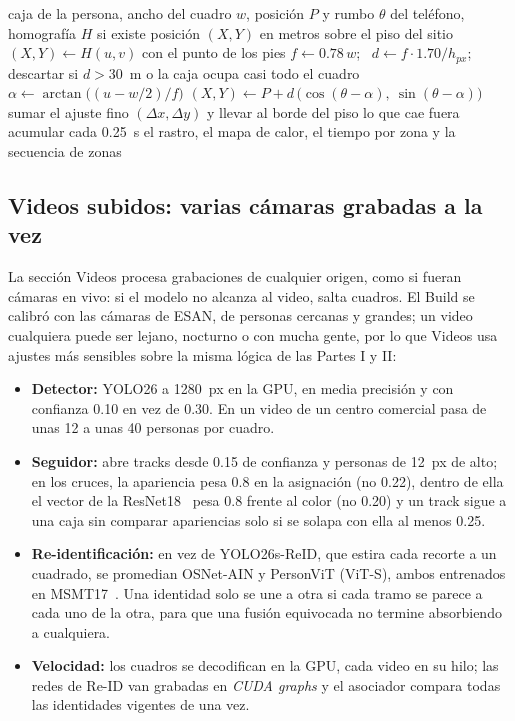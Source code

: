 \documentclass[12pt,a4paper]{article}
\begin{document}
\begin{algorithm}[H]
\caption{Ubicación en el plano desde un teléfono}
\label{alg:ubicacion}
\begin{algorithmic}[1]
\REQUIRE caja de la persona, ancho del cuadro $w$, posición $P$ y rumbo $\theta$ del teléfono, homografía $H$ si existe
\ENSURE posición $(X,Y)$ en metros sobre el piso del sitio
  \STATE $(X,Y) \leftarrow H(u,v)$ con el punto de los pies
\ELSE
  \STATE $f \leftarrow 0.78\,w$; \ $d \leftarrow f \cdot 1.70 / h_{px}$; descartar si $d > 30$~m o la caja ocupa casi todo el cuadro
  \STATE $\alpha \leftarrow \arctan\big((u - w/2)/f\big)$
  \STATE $(X,Y) \leftarrow P + d\,\big(\cos(\theta-\alpha),\ \sin(\theta-\alpha)\big)$
\ENDIF
\STATE sumar el ajuste fino $(\Delta x, \Delta y)$ y llevar al borde del piso lo que cae fuera
\STATE acumular cada 0.25~s el rastro, el mapa de calor, el tiempo por zona y la secuencia de zonas
\end{algorithmic}
\end{algorithm}

\subsection{Videos subidos: varias cámaras grabadas a la vez}
\label{sec:videos}

La sección Videos procesa grabaciones de cualquier origen, como si fueran
cámaras en vivo: si el modelo no alcanza al video, salta cuadros. El Build se
calibró con las cámaras de ESAN, de personas cercanas y grandes; un video
cualquiera puede ser lejano, nocturno o con mucha gente, por lo que Videos usa
ajustes más sensibles sobre la misma lógica de las Partes I y II:

\begin{itemize}
    \item \textbf{Detector:} YOLO26 a 1280~px en la GPU, en media precisión y
    con confianza 0.10 en vez de 0.30. En un video de un centro comercial pasa
    de unas 12 a unas 40 personas por cuadro.
    \item \textbf{Seguidor:} abre tracks desde 0.15 de confianza y personas de
    12~px de alto; en los cruces, la apariencia pesa 0.8 en la asignación (no
    0.22), dentro de ella el vector de la ResNet18~\cite{he2016} pesa 0.8 frente al color
    (no 0.20) y un track sigue a una caja sin comparar apariencias solo si se
    solapa con ella al menos 0.25.
    \item \textbf{Re-identificación:} en vez de YOLO26s-ReID, que estira cada
    recorte a un cuadrado, se promedian OSNet-AIN y PersonViT (ViT-S), ambos
    entrenados en MSMT17~\cite{wei2018}. Una identidad solo se une a otra si cada tramo se
    parece a cada uno de la otra, para que una fusión equivocada no termine
    absorbiendo a cualquiera.
    \item \textbf{Velocidad:} los cuadros se decodifican en la GPU, cada video
    en su hilo; las redes de Re-ID van grabadas en \textit{CUDA graphs} y el
    asociador compara todas las identidades vigentes de una vez.
\end{itemize}
\end{document}
